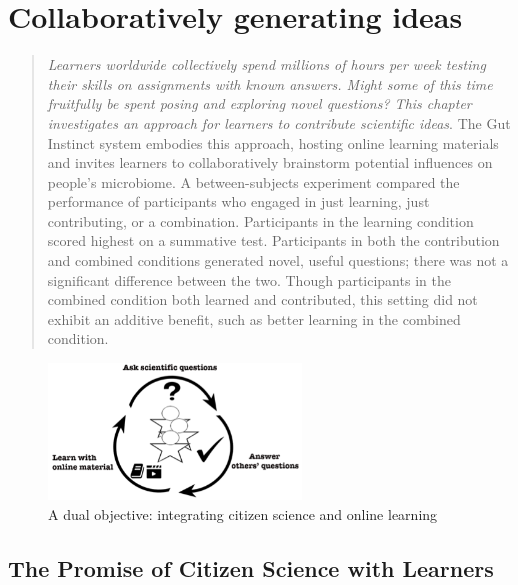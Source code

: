 \chapter{Collaboratively generating ideas}

\begin{quote}
\emph{Learners worldwide collectively spend millions of hours per week testing their skills on assignments with known answers. Might some of this time fruitfully be spent posing and exploring novel questions? This chapter investigates an approach for learners to contribute scientific ideas}. The Gut Instinct system embodies this approach, hosting online learning materials and invites learners to collaboratively brainstorm potential influences on people’s microbiome. A between-subjects experiment compared the performance of participants who engaged in just learning, just contributing, or a combination. Participants in the learning condition scored highest on a summative test. Participants in both the contribution and combined conditions generated novel, useful questions; there was not a significant difference between the two. Though participants in the combined condition both learned and contributed, this setting did not exhibit an additive benefit, such as better learning in the combined condition. 
\end{quote}

\begin{figure}[h]
  \centering
  \includegraphics[width=0.6\textwidth]{figures/gutinstinct/gi-1.png}
  \caption[A dual objective: integrating citizen science and online learning]
{A dual objective: integrating citizen science and online learning}
  \label{fig:gi-1}
\end{figure}

\vspace{0.25in}


\section{The Promise of Citizen Science with Learners}

